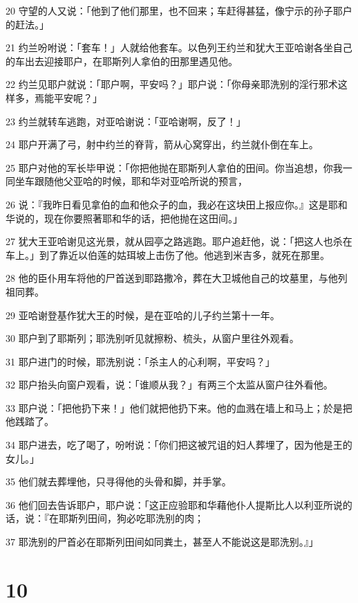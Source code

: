 \par 20 守望的人又说：「他到了他们那里，也不回来；车赶得甚猛，像宁示的孙子耶户的赶法。」
\par 21 约兰吩咐说：「套车！」人就给他套车。以色列王约兰和犹大王亚哈谢各坐自己的车出去迎接耶户，在耶斯列人拿伯的田那里遇见他。
\par 22 约兰见耶户就说：「耶户啊，平安吗？」耶户说：「你母亲耶洗别的淫行邪术这样多，焉能平安呢？」
\par 23 约兰就转车逃跑，对亚哈谢说：「亚哈谢啊，反了！」
\par 24 耶户开满了弓，射中约兰的脊背，箭从心窝穿出，约兰就仆倒在车上。
\par 25 耶户对他的军长毕甲说：「你把他抛在耶斯列人拿伯的田间。你当追想，你我一同坐车跟随他父亚哈的时候，耶和华对亚哈所说的预言，
\par 26 说：『我昨日看见拿伯的血和他众子的血，我必在这块田上报应你。』这是耶和华说的，现在你要照著耶和华的话，把他抛在这田间。」
\par 27 犹大王亚哈谢见这光景，就从园亭之路逃跑。耶户追赶他，说：「把这人也杀在车上。」到了靠近以伯莲的姑珥坡上击伤了他。他逃到米吉多，就死在那里。
\par 28 他的臣仆用车将他的尸首送到耶路撒冷，葬在大卫城他自己的坟墓里，与他列祖同葬。
\par 29 亚哈谢登基作犹大王的时候，是在亚哈的儿子约兰第十一年。
\par 30 耶户到了耶斯列；耶洗别听见就擦粉、梳头，从窗户里往外观看。
\par 31 耶户进门的时候，耶洗别说：「杀主人的心利啊，平安吗？」
\par 32 耶户抬头向窗户观看，说：「谁顺从我？」有两三个太监从窗户往外看他。
\par 33 耶户说：「把他扔下来！」他们就把他扔下来。他的血溅在墙上和马上；於是把他践踏了。
\par 34 耶户进去，吃了喝了，吩咐说：「你们把这被咒诅的妇人葬埋了，因为他是王的女儿。」
\par 35 他们就去葬埋他，只寻得他的头骨和脚，并手掌。
\par 36 他们回去告诉耶户，耶户说：「这正应验耶和华藉他仆人提斯比人以利亚所说的话，说：『在耶斯列田间，狗必吃耶洗别的肉；
\par 37 耶洗别的尸首必在耶斯列田间如同粪土，甚至人不能说这是耶洗别。』」

\chapter{10}

